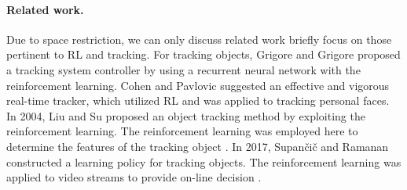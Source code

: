 \documentclass{svproc}
\begin{document}
	\paragraph{Related work.} 
	Due to space restriction, we can only discuss related work briefly focus on those pertinent to RL and tracking. %
	For tracking objects, Grigore and Grigore \cite{Grigore2000Reinforcement} proposed a tracking system controller by using a recurrent neural network with the reinforcement learning. %
	Cohen and Pavlovic \cite{Cohen2010Reinforcement} suggested an effective and vigorous real-time tracker, which utilized RL and was applied to tracking personal faces. In 2004, Liu and Su proposed an object tracking method by exploiting the reinforcement learning. The reinforcement learning was employed here to determine the features of the tracking object \cite{Liu2004Reinforcement}. In 2017, Supan\v{c}i\v{c} and Ramanan constructed a learning policy for tracking objects. The reinforcement learning was applied to video streams to provide on-line decision \cite{Supancic2017Tracking}. 
	
	
\end{document}
